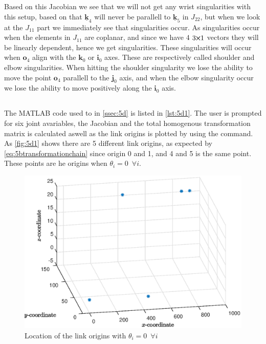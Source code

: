 \documentclass[a4paper]{scrartcl}
\begin{document}
Based on this Jacobian we see that we will not get any wrist singularities with this setup, based on that $\underline{\bm{k}}_4$ will never be parallell to $\underline{\bm{k}}_5$ in $J_{22}$, but when we look at the $J_{11}$ part we immediately see that singularities occur. As singularities occur when the elements in $J_{11}$ are coplanar, and since we have $4$ $3\!\!\cross\!\!1$ vectors they will be linearly dependent, hence we get singularities. These singularities will occur when $\bm{o}_4$ align with the $\bm{k}_0$ or $\bm{i}_0$ axes. These are respectively called shoulder and elbow singularities. When hitting the shoulder singularity we lose the ability to move the point $\bm{o}_4$ parallell to the $\bm{j}_0$ axis, and when the elbow singularity occur we lose the ability to move positively along the $\bm{i}_0$ axis.


\subsection{}\label{ssec:5d} %
The MATLAB code used to in \autoref{ssec:5d} is listed in \autoref{lst:5d1}. The user is prompted for six joint avariables, the Jacobian and the total homogenous transformation matrix is calculated aswell as the link origins is plotted by using the  command. As \autoref{fig:5d1} shows there are 5 different link origins, as expected by \eqref{eq:5btransformationchain} since origin 0 and 1, and 4 and 5 is the same point. These points are he origins when $\theta_i = 0 \enspace \forall i$.

\begin{figure}[ht!]
    \centering
    \includegraphics[width = .95\textwidth]{5d_new.eps}
    \caption{Location of the link origins with $\theta_i = 0 \enspace \forall i$}
    \label{fig:5d1}
\end{figure}
\end{document}
